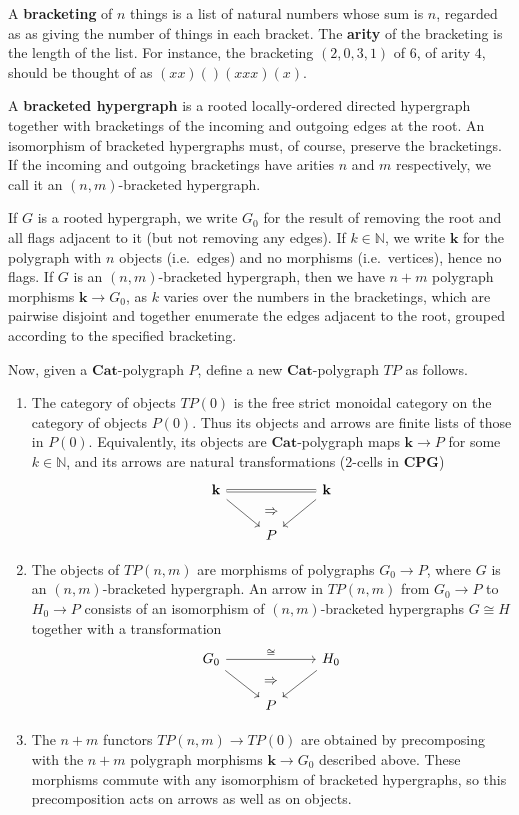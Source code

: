\documentclass{article}
\theoremstyle{definition}
\theoremstyle{remark}
\def\Cat{\ensuremath{\mathbf{Cat}}}
\def\cpg{\ensuremath{\mathbf{CPG}}\xspace}
\def\N{\mathbb{N}}
\begin{document}
A \textbf{bracketing} of $n$ things is a list of natural numbers whose sum is $n$, regarded as as giving the number of things in each bracket.
The \textbf{arity} of the bracketing is the length of the list.
For instance, the bracketing $(2,0,3,1)$ of $6$, of arity $4$, should be thought of as $(xx)()(xxx)(x)$.

A \textbf{bracketed hypergraph} is a rooted locally-ordered directed hypergraph together with bracketings of the incoming and outgoing edges at the root.
An isomorphism of bracketed hypergraphs must, of course, preserve the bracketings.
If the incoming and outgoing bracketings have arities $n$ and $m$ respectively, we call it an $(n,m)$-bracketed hypergraph.

If $G$ is a rooted hypergraph, we write $G_0$ for the result of removing the root and all flags adjacent to it (but not removing any edges).
If $k\in\N$, we write $\mathbf{k}$ for the polygraph with $n$ objects (i.e.\ edges) and no morphisms (i.e.\ vertices), hence no flags.
If $G$ is an $(n,m)$-bracketed hypergraph, then we have $n+m$ polygraph morphisms $\mathbf{k}\to G_0$, as $k$ varies over the numbers in the bracketings, which are pairwise disjoint and together enumerate the edges adjacent to the root, grouped according to the specified bracketing.

Now, given a \Cat-polygraph $P$, define a new \Cat-polygraph $T P$ as follows.
\begin{enumerate}
\item The category of objects $T P(0)$ is the free strict monoidal category on the category of objects $P(0)$.
  Thus its objects and arrows are finite lists of those in $P(0)$.
  Equivalently, its objects are \Cat-polygraph maps $\mathbf{k}\to P$ for some $k\in\N$, and its arrows are natural transformations (2-cells in \cpg)
  \[
  \begin{tikzcd}
    \mathbf{k} \ar[rr,equals] \ar[dr] & ~ \ar[d,phantom,"\Rightarrow"] & \mathbf{k} \ar[dl] \\ & P
  \end{tikzcd}
  \]
\item The objects of $TP(n,m)$ are morphisms of polygraphs $G_0\to P$, where $G$ is an $(n,m)$-bracketed hypergraph.
  An arrow in $TP(n,m)$ from $G_0\to P$ to $H_0\to P$ consists of an isomorphism of $(n,m)$-bracketed hypergraphs $G\cong H$ together with a transformation
  \[
  \begin{tikzcd}
    G_0 \ar[rr,"\cong"] \ar[dr] & ~ \ar[d,phantom,"\Rightarrow"] & H_0 \ar[dl] \\ & P
  \end{tikzcd}
  \]
\item The $n+m$ functors $TP(n,m) \to TP(0)$ are obtained by precomposing with the $n+m$ polygraph morphisms $\mathbf{k}\to G_0$ described above.
  These morphisms commute with any isomorphism of bracketed hypergraphs, so this precomposition acts on arrows as well as on objects.
\end{enumerate}
\end{document}
